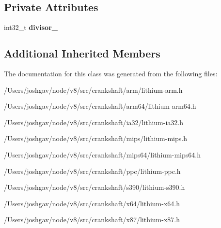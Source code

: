 \subsection*{Private Attributes}
\begin{DoxyCompactItemize}
\item 
int32\+\_\+t {\bfseries divisor\+\_\+}\hypertarget{classv8_1_1internal_1_1_l_flooring_div_by_const_i_ab30236adec4ee28cdbdae9b14af3e606}{}\label{classv8_1_1internal_1_1_l_flooring_div_by_const_i_ab30236adec4ee28cdbdae9b14af3e606}

\end{DoxyCompactItemize}
\subsection*{Additional Inherited Members}


The documentation for this class was generated from the following files\+:\begin{DoxyCompactItemize}
\item 
/\+Users/joshgav/node/v8/src/crankshaft/arm/lithium-\/arm.\+h\item 
/\+Users/joshgav/node/v8/src/crankshaft/arm64/lithium-\/arm64.\+h\item 
/\+Users/joshgav/node/v8/src/crankshaft/ia32/lithium-\/ia32.\+h\item 
/\+Users/joshgav/node/v8/src/crankshaft/mips/lithium-\/mips.\+h\item 
/\+Users/joshgav/node/v8/src/crankshaft/mips64/lithium-\/mips64.\+h\item 
/\+Users/joshgav/node/v8/src/crankshaft/ppc/lithium-\/ppc.\+h\item 
/\+Users/joshgav/node/v8/src/crankshaft/s390/lithium-\/s390.\+h\item 
/\+Users/joshgav/node/v8/src/crankshaft/x64/lithium-\/x64.\+h\item 
/\+Users/joshgav/node/v8/src/crankshaft/x87/lithium-\/x87.\+h\end{DoxyCompactItemize}

